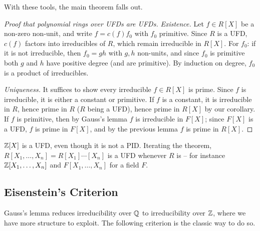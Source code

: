 \documentclass[a4paper]{scrartcl}
\begin{document}
With these tools, the main theorem falls out.

\begin{proof}[Proof that polynomial rings over UFDs are UFDs]
	\emph{Existence.} Let $f \in R[X]$ be a non-zero non-unit, and write $f = c(f)f_0$ with $f_0$ primitive. Since $R$ is a UFD, $c(f)$ factors into irreducibles of $R$, which remain irreducible in $R[X]$. For $f_0$: if it is not irreducible, then $f_0 = gh$ with $g, h$ non-units, and since $f_0$ is primitive both $g$ and $h$ have positive degree (and are primitive). By induction on degree, $f_0$ is a product of irreducibles.

	\emph{Uniqueness.} It suffices to show every irreducible $f \in R[X]$ is prime. Since $f$ is irreducible, it is either a constant or primitive. If $f$ is a constant, it is irreducible in $R$, hence prime in $R$ ($R$ being a UFD), hence prime in $R[X]$ by our corollary. If $f$ is primitive, then by Gauss's lemma $f$ is irreducible in $F[X]$; since $F[X]$ is a UFD, $f$ is prime in $F[X]$, and by the previous lemma $f$ is prime in $R[X]$.
\end{proof}

\begin{example}
	$\mathbb{Z}[X]$ is a UFD, even though it is not a PID. Iterating the theorem, $R[X_1, \dots, X_n] = R[X_1]\cdots[X_n]$ is a UFD whenever $R$ is -- for instance $\mathbb{Z}[X_1, \dots, X_n]$ and $F[X_1, \dots, X_n]$ for a field $F$.
\end{example}

\subsection{Eisenstein's Criterion}

Gauss's lemma reduces irreducibility over $\mathbb{Q}$ to irreducibility over $\mathbb{Z}$, where we have more structure to exploit. The following criterion is the classic way to do so.
\end{document}
